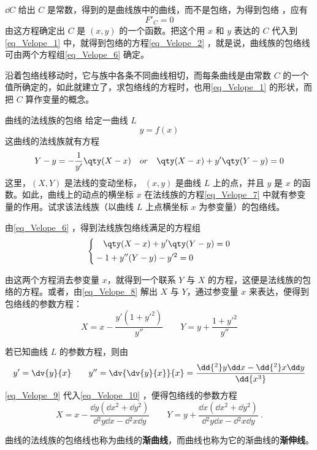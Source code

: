 $\dd C$ 给出 $C$ 是常数，得到的是曲线族中的曲线，而不是包络，为得到包络
，应有
\begin{equation}
F'_C=0
\end{equation}
由这方程确定出 $C$ 是 $(x,y)$ 的一个函数。把这个用 $x$ 和 $y$ 表达的 $C$ 代入到\autoref{eq_Velope_1} 中，就得到包络的方程\autoref{eq_Velope_2} ，就是说，曲线族的包络线可由两个方程组\autoref{eq_Velope_6} 确定。

沿着包络线移动时，它与族中各条不同曲线相切，而每条曲线是由常数 $C$ 的一个值所确定的，如此就建立了，求包络线的方程时，也用\autoref{eq_Velope_1} 的形状，而把 $C$ 算作变量的概念。
\begin{example}{曲线的法线族的包络}
给定一曲线 $L$
\begin{equation}
y=f(x)
\end{equation}
这曲线的法线族就有方程
\begin{equation}\label{eq_Velope_7}
Y-y=-\frac{1}{y'}\qty(X-x)\quad or\quad\qty(X-x)+y'\qty(Y-y)=0
\end{equation}
这里，$(X,Y)$ 是法线的变动坐标， $(x,y)$ 是曲线 $L$ 上的点，并且 $y$ 是 $x$ 的函数。如此，曲线上的动点的横坐标 $x$ 在法线族的方程\autoref{eq_Velope_7} 中就有参变量的作用。试求该法线族（以曲线 $L$ 上点横坐标 $x$ 为参变量）的包络线。

由\autoref{eq_Velope_6} ，得到法线族包络线满足的方程组
\begin{equation}\label{eq_Velope_8}
\left\{\begin{aligned}
&\quad\qty(X-x)+y'\qty(Y-y)=0\\
&-1+y''(Y-y)-y'^2=0
\end{aligned}\right.
\end{equation}
 

由这两个方程消去参变量 $x$，就得到一个联系 $Y$ 与 $X$ 的方程，这便是法线族的包络的方程。或者，由\autoref{eq_Velope_8} 解出 $X$ 与 $Y$，通过参变量 $x$ 来表达，便得到包络线的参数方程：
\begin{equation}\label{eq_Velope_10}
X=x-\frac{y'(1+y'^2)}{y''}\qquad Y=y+\frac{1+y'^2}{y''}
\end{equation}

若已知曲线 $L$ 的参数方程，则由
\begin{equation}\label{eq_Velope_9}
y'=\dv{y}{x}\qquad y''=\dv{\dv{y}{x}}{x}=\frac{\dd{^2}y\dd x-\dd{^2}x\dd y}{\dd{x^3}}
\end{equation}
\autoref{eq_Velope_9} 代入\autoref{eq_Velope_10} ，便得包络线的参数方程
\begin{equation}
X=x-\frac{\dd y(\dd x^2+\dd y^2)}{\dd{^2y\dd x}-\dd{^2x}\dd y}
\qquad Y=y+\frac{\dd x(\dd x^2+\dd y^2)}{\dd{^2y}\dd x-\dd{^2x}\dd y}~.
\end{equation}

曲线的法线族的包络线也称为曲线的\textbf{渐曲线}，而曲线也称为它的渐曲线的\textbf{渐伸线}。
\end{example}